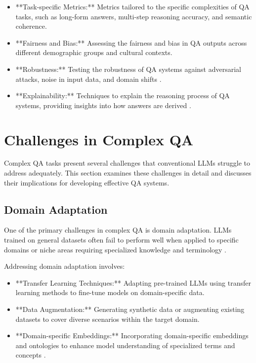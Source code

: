 \documentclass[a4paper,12pt]{article}
\begin{document}
\begin{itemize}
    \item **Task-specific Metrics:** Metrics tailored to the specific complexities of QA tasks, such as long-form answers, multi-step reasoning accuracy, and semantic coherence.
    \item **Fairness and Bias:** Assessing the fairness and bias in QA outputs across different demographic groups and cultural contexts.
    \item **Robustness:** Testing the robustness of QA systems against adversarial attacks, noise in input data, and domain shifts \cite{gpt3_paper}.
    \item **Explainability:** Techniques to explain the reasoning process of QA systems, providing insights into how answers are derived \cite{explainable_ai_paper}.
\end{itemize}

\section{Challenges in Complex QA}
\label{sec:challenges_qa}

Complex QA tasks present several challenges that conventional LLMs struggle to address adequately. This section examines these challenges in detail and discusses their implications for developing effective QA systems.

\subsection{Domain Adaptation}
\label{subsec:domain_adaptation}

One of the primary challenges in complex QA is domain adaptation. LLMs trained on general datasets often fail to perform well when applied to specific domains or niche areas requiring specialized knowledge and terminology \cite{transformers_paper}.

Addressing domain adaptation involves:

\begin{itemize}
    \item **Transfer Learning Techniques:** Adapting pre-trained LLMs using transfer learning methods to fine-tune models on domain-specific data.
    \item **Data Augmentation:** Generating synthetic data or augmenting existing datasets to cover diverse scenarios within the target domain.
    \item **Domain-specific Embeddings:** Incorporating domain-specific embeddings and ontologies to enhance model understanding of specialized terms and concepts \cite{hybrid_architectures_paper}.
\end{itemize}
\end{document}
